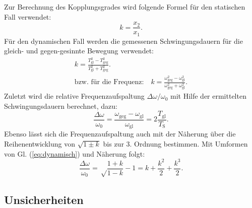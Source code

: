 \documentclass[11pt,a4paper,titlepage, ngerman]{article}
\newcommand{\refeq}[1]{Gl. (\ref{eq:#1})}
\begin{document}
			Zur Berechnung des Kopplungsgrades wird folgende Formel für den statischen Fall verwendet: 
			\begin{equation}
				k = \frac{x_2}{x_1}. \label{eq:statisch}
			\end{equation}
			Für den dynamischen Fall werden die gemessenen Schwingungsdauern für die gleich- und gegen-gesinnte Bewegung verwendet:
			\begin{align}
				k = \frac{T_\text{gl}^2-T_\text{geg}^2}{T_\text{gl}^2+T_\text{geg}^2}. \label{eq:dynamisch} \\
				\text{bzw. für die Frequenz:} \quad k = \frac{\omega_\text{geg}^2-\omega_\text{gl}^2}{\omega_\text{geg}^2+\omega_\text{gl}^2}.
			\end{align}
			Zuletzt wird die relative Frequenzaufspaltung $\Delta\omega / \omega_0$ mit Hilfe der ermittelten Schwingungsdauern berechnet, dazu:
			\begin{equation}
				\frac{\Delta\omega}{\omega_0} = \frac{\omega_\text{geg}-\omega_\text{gl}}{\omega_\text{gl}} = 2\frac{T_\text{gl}}{T_\text{S}}. \label{eq:freqfrac} 	
			\end{equation}		
			Ebenso lässt sich die Frequenzaufspaltung auch mit der Näherung über die Reihenentwicklung von $\sqrt{1\pm k}$ bis zur 3. Ordnung bestimmen. Mit Umformen von \refeq{dynamisch} und Näherung folgt:
			\begin{equation}
				\frac{\Delta\omega}{\omega_0} = \sqrt\frac{1+k}{1-k}-1 = k + \frac{k^2}{2} + \frac{k^3}{2}. \label{eq:freqfrac2} 
			\end{equation}
		
		\subsection*{Unsicherheiten}
			
\end{document}
